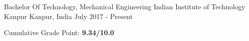 
\begin{cventries}

  \cventry
    {Bachelor Of Technology, Mechanical Engineering}
    {Indian Institute of Technology Kanpur}
    {Kanpur, India}
    {July 2017 - Present}
    {
      \begin{cvitems}
        \item {Cumulative Grade Point: \textbf{9.34/10.0}}
      \end{cvitems}
    }
  
\end{cventries}

